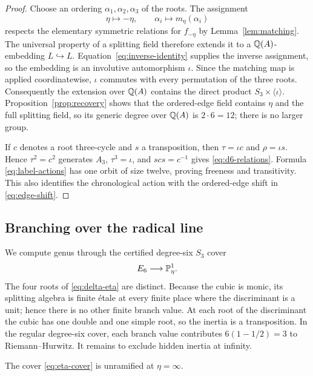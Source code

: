 \begin{proof}
Choose an ordering $\alpha_1,\alpha_2,\alpha_3$ of the roots.  The assignment
\[
 \eta\longmapsto-\eta,
 \qquad
 \alpha_i\longmapsto m_\eta(\alpha_i)
\]
respects the elementary symmetric relations for $f_{-\eta}$ by
Lemma~\ref{lem:matching}.  The universal property of a splitting field
therefore extends it to a $\mathbb Q(A)$-embedding $L\hookrightarrow L$.
Equation~\eqref{eq:inverse-identity} supplies the inverse assignment, so the
embedding is an involutive automorphism $\iota$.  Since the matching map is
applied coordinatewise, $\iota$ commutes with every permutation of the three
roots.  Consequently the extension over $\mathbb Q(A)$ contains the direct product
$S_3\times\langle\iota\rangle$.  Proposition~\ref{prop:recovery}
shows that the ordered-edge field contains $\eta$ and the full splitting
field, so its generic degree over $\mathbb Q(A)$ is $2\cdot6=12$; there is no larger
group.

If $c$ denotes a root three-cycle and $s$ a transposition, then
$\tau=\iota c$ and $\rho=\iota s$.  Hence
$\tau^2=c^2$ generates $A_3$, $\tau^3=\iota$, and
$s c s=c^{-1}$ gives \eqref{eq:d6-relations}.  Formula
\eqref{eq:label-actions} has one orbit of size twelve, proving freeness and
transitivity.  This also identifies the chronological action with the
ordered-edge shift in \eqref{eq:edge-shift}.
\end{proof}

\subsection{Branching over the radical line}

We compute genus through the certified degree-six $S_3$ cover
\begin{equation}\label{eq:eta-cover}
 E_6\longrightarrow\mathbb P^1_\eta.
\end{equation}
The four roots of \eqref{eq:delta-eta} are distinct.  Because the cubic is
monic, its splitting algebra is finite étale at every finite place where the
discriminant is a unit; hence there is no other finite branch value.  At each
root of the discriminant the cubic has one double and one simple root, so the
inertia is a transposition.  In
the regular degree-six cover, each branch value contributes
$6(1-1/2)=3$ to Riemann--Hurwitz.  It remains to exclude hidden inertia at
infinity.

\begin{lemma}\label{lem:infinity}
The cover \eqref{eq:eta-cover} is unramified at $\eta=\infty$.
\end{lemma}

